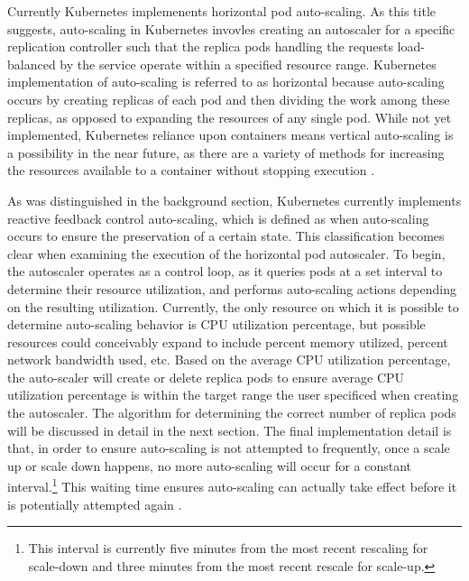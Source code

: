 Currently Kubernetes implemenents horizontal pod auto-scaling.
As this title suggests, auto-scaling in
Kubernetes invovles creating an autoscaler for a specific replication
controller such that the replica pods handling the requests load-balanced by the service
operate within a specified resource range. Kubernetes
implementation of auto-scaling is referred to as horizontal because
auto-scaling occurs by creating replicas of each pod and then dividing the work
among these replicas, as opposed to expanding the resources of any single pod.
While not yet implemented, Kubernetes reliance upon containers means vertical
auto-scaling is a possibility in the near future, as there are a variety of
methods for increasing the resources available to a container without stopping
execution \cite{docker-up-and-running}.

As was distinguished in the background section, Kubernetes currently implements reactive
feedback control auto-scaling, which is defined as when auto-scaling occurs to
ensure the preservation of a certain state.
This classification becomes clear when examining
the execution of the horizontal pod autoscaler. To begin, the autoscaler
operates as a control loop, as it queries pods at a set interval to determine
their resource utilization, and performs auto-scaling actions depending on the
resulting utilization. Currently, the only resource on which it is possible to
determine auto-scaling behavior is CPU utilization percentage, but possible
resources could conceivably expand to include percent memory utilized, percent
network bandwidth used, etc. Based on the average CPU utilization percentage, the
auto-scaler will create or delete replica pods to ensure average CPU utilization
percentage is within the target range the user specificed when creating the
autoscaler. The algorithm for determining the correct number of replica pods
will be discussed in detail in the next section. The final implementation detail
is that, in order to ensure auto-scaling is not attempted to frequently, once a
scale up or scale down happens, no more auto-scaling will occur for a constant
interval.\footnote{This interval is currently five minutes from the most recent
rescaling for scale-down and three minutes from the most recent rescale for
scale-up.} This waiting time ensures auto-scaling can actually take effect
before it is potentially attempted again \cite{k8s-horizontal-pod-autoscaler-user-guide}.
